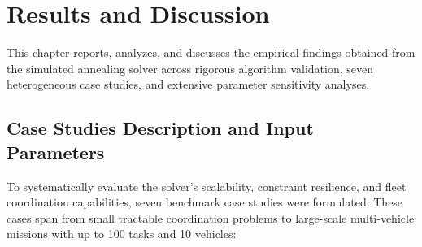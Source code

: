 \chapter{Results and Discussion}\label{chap:results}

This chapter reports, analyzes, and discusses the empirical findings obtained from the simulated annealing solver across rigorous algorithm validation, seven heterogeneous case studies, and extensive parameter sensitivity analyses.

\section{Case Studies Description and Input Parameters}\label{sec:case_studies_desc}
To systematically evaluate the solver's scalability, constraint resilience, and fleet coordination capabilities, seven benchmark case studies were formulated. These cases span from small tractable coordination problems to large-scale multi-vehicle missions with up to 100 tasks and 10 vehicles:
